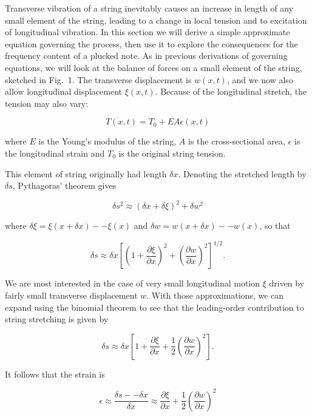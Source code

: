   Transverse vibration of a string inevitably causes an increase in length of 
  any small element of the string, leading to a change in local tension and to 
  excitation of longitudinal vibration. In this section we will derive a simple 
  approximate equation governing the process, then use it to explore the 
  consequences for the frequency content of a plucked note. As in previous 
  derivations of governing equations, we will look at the balance of forces on 
  a small element of the string, sketched in Fig.\ 1. The transverse 
  displacement is $w(x,t)$, and we now also allow longitudinal displacement 
  $\xi(x,t)$. Because of the longitudinal stretch, the tension may also vary: 

  $$T(x,t) = T_0 +EA\epsilon(x,t) \tag{1}$$ 

  where $E$ is the Young's modulus of the string, $A$ is the cross-sectional 
  area, $\epsilon$ is the longitudinal strain and $T_0$ is the original string 
  tension. 


  This element of string originally had length $\delta x$. Denoting the 
  stretched length by $\delta s$, Pythagoras' theorem gives 

  $$\delta s^2 \approx (\delta x + \delta \xi)^2 + \delta w^2 \tag{2} $$ 

  where $\delta \xi=\xi(x + \delta x) -- \xi(x)$ and $\delta w=w(x + \delta x) 
  -- w(x)$, so that 

  $$\delta s \approx \delta x \left[ \left(1 + \dfrac{\partial \xi}{\partial 
  x}\right)^2 + \left(\dfrac{\partial w}{\partial x}\right)^2 \right]^{1/2} . 
  \tag{3}$$ 

  We are most interested in the case of very small longitudinal motion $\xi$ 
  driven by fairly small transverse displacement $w$. With those 
  approximations, we can expand using the binomial theorem to see that the 
  leading-order contribution to string stretching is given by 

  $$\delta s \approx \delta x \left[ 1 + \dfrac{\partial \xi}{\partial x} + 
  \dfrac{1}{2}\left(\dfrac{\partial w}{\partial x}\right)^2 \right] . \tag{4}$$ 

  It follows that the strain is 

  $$\epsilon \approx \dfrac{\delta s -- \delta x}{\delta x} \approx 
  \dfrac{\partial \xi}{\partial x} + \dfrac{1}{2}\left(\dfrac{\partial 
  w}{\partial x}\right)^2 \tag{5}$$ 

